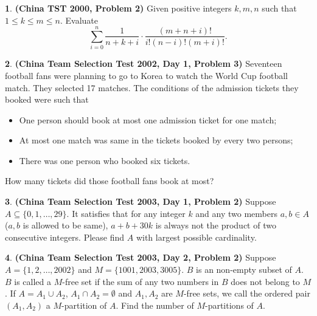 \documentclass{article}
\theoremstyle{definition}
\newtheorem{p}{}
\begin{document}
\begin{p}{\bf(China TST 2000, Problem 2)}
Given positive integers $k, m, n$ such that $1 \leq  k \leq  m \leq  n$. Evaluate
\[\sum^{n}_{i=0} \frac{1}{n+k+i} \cdot \frac{(m+n+i)!}{i!(n-i)!(m+i)!}.\]
\end{p}


\begin{p}{\bf(China Team Selection Test 2002, Day 1, Problem 3)}
Seventeen football fans were planning to go to Korea to watch the World Cup football match. They selected 17 matches. The conditions of the admission tickets they booked were such that

\begin{itemize}

\item One person should book at most one admission ticket for one match;

\item At most one match was same in the tickets booked by every two persons;

\item  There was one person who booked six tickets.

\end{itemize}
How many tickets did those football fans book at most?
\end{p}




\begin{p}{\bf (China Team Selection Test 2003, Day 1, Problem 2)}
Suppose $A\subseteq \{0,1,\dots,29\}$. It satisfies that for any integer $k$ and any two members $a,b\in A$($a,b$ is allowed to be same), $a+b+30k$ is always not the product of two consecutive integers. Please find $A$ with largest possible cardinality.
\end{p}





\begin{p}{\bf (China Team Selection Test 2003, Day 2, Problem 2)}
Suppose $A=\{1,2,\dots,2002\}$ and $M=\{1001,2003,3005\}$. $B$ is an non-empty subset of $A$. $B$ is called a $M$-free set if the sum of any two numbers in $B$ does not belong to $M$. If $A=A_1\cup A_2$, $A_1\cap A_2=\emptyset$ and $A_1,A_2$ are $M$-free sets, we call the ordered pair $(A_1,A_2)$ a $M$-partition of $A$. Find the number of $M$-partitions of $A$.
\end{p}
\end{document}

